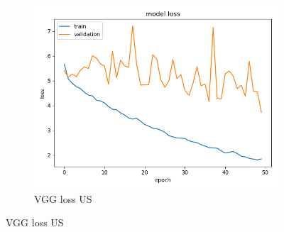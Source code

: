 \begin{figure}
\begin{subfigure}[b]{.3\linewidth}
\includegraphics[width=\linewidth]{Figs/resnet_us_loss.jpg}
\caption{VGG loss US}\label{fig:tiger}
\end{subfigure}


\end{figure}
